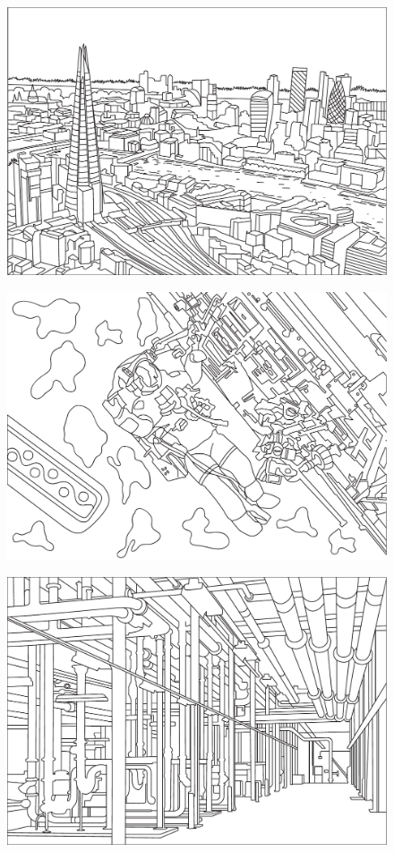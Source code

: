 \begin{figure}[!h]
\centering
\begin{sideways}
\includegraphics{./artwork/london}
\end{sideways}
\end{figure}
\pagebreak
\begin{figure}[!h]
\centering
\begin{sideways}
\includegraphics{./artwork/space}
\end{sideways}
\end{figure}
\pagebreak
\begin{figure}[!h]
\centering
\begin{sideways}
\includegraphics{./artwork/data_center}
\end{sideways}
\end{figure}
\pagebreak